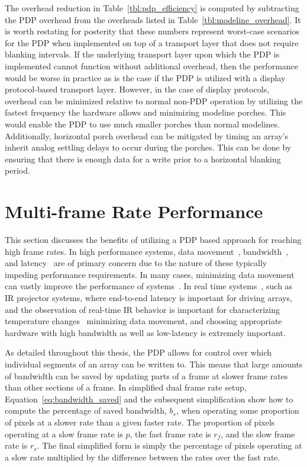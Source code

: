     The overhead reduction in Table~\ref{tbl:pdp_efficiency} is computed by subtracting the PDP overhead from the overheads listed in Table~\ref{tbl:modeline_overhead}. It is worth restating for posterity that these numbers represent worst-case scenarios for the PDP when implemented on top of a transport layer that does not require blanking intervals. If the underlying transport layer upon which the PDP is implemented cannot function without additional overhead, then the performance would be worse in practice as is the case if the PDP is utilized with a display protocol-based transport layer. However, in the case of display protocols, overhead can be minimized relative to normal non-PDP operation by utilizing the fastest frequency the hardware allows and minimizing modeline porches. This would enable the PDP to use much smaller porches than normal modelines. Additionally, horizontal porch overhead can be mitigated by timing an array's inherit analog settling delays to occur during the porches. This can be done by ensuring that there is enough data for a write prior to a horizontal blanking period.

\section{Multi-frame Rate Performance}
    \label{sec:multi_framerate_performance}

    This section discusses the benefits of utilizing a PDP based approach for reaching high frame rates. In high performance systems, data movement~\cite{LeeEtAl1984}, bandwidth~\cite{LaiBaker1999}, and latency~\cite{ZhengEtAl2014} are of primary concern due to the nature of these typically impeding performance requirements. In many cases, minimizing data movement can vastly improve the performance of systems~\cite{BandyopadhyayCoyle2004,LiEtAl2009,Hall2020}. In real time systems~\cite{Kopetz2011}, such as IR projector systems, where end-to-end latency is important for driving arrays, and the observation of real-time IR behavior is important for characterizing temperature changes~\cite{ZhouEtAl2000} minimizing data movement, and choosing appropriate hardware with high bandwidth as well as low-latency is extremely important.

    As detailed throughout this thesis, the PDP allows for control over which individual segments of an array can be written to. This means that large amounts of bandwidth can be saved by updating parts of a frame at slower frame rates than other sections of a frame. In simplified dual frame rate setup, Equation~\eqref{eq:bandwidth_saved} and the subsequent simplification show how to compute the percentage of saved bandwidth, $b_s$, when operating some proportion of pixels at a slower rate than a given faster rate. The proportion of pixels operating at a slow frame rate is $p$, the fast frame rate is $r_f$, and the slow frame rate is $r_s$. The final simplified form is simply the percentage of pixels operating at a slow rate multiplied by the difference between the rates over the fast rate.

